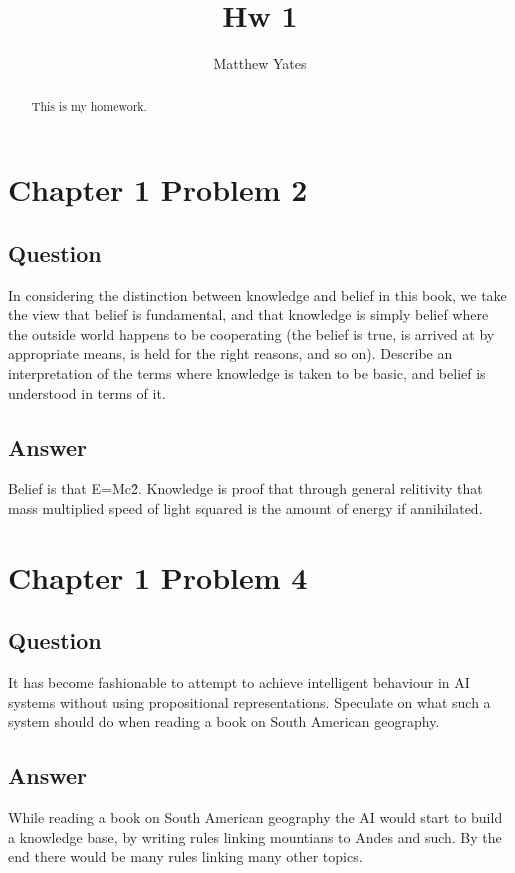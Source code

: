 \documentclass[10pt]{article}         %
\title{Hw 1}
\author{Matthew Yates}
\begin{document}
\maketitle

\begin{abstract}
This is my homework.
\end{abstract}

\section{Chapter 1 Problem 2}
\subsection{Question}
 In considering the distinction between knowledge and belief in this book,
 we take the view that belief is fundamental, and that knowledge is simply
 belief where the outside world happens to be cooperating (the belief is true,
 is arrived at by appropriate means, is held for the right reasons, and so on).
 Describe an interpretation of the terms where knowledge is taken to be basic,
 and belief is understood in terms of it.

\subsection{Answer}
Belief is that E=Mc\^2. Knowledge is proof that through general relitivity that
mass multiplied speed of light squared is the amount of energy if annihilated.

\section{Chapter 1 Problem 4}
\subsection{Question}
It has become fashionable to attempt to achieve intelligent behaviour in AI
systems without using propositional representations. Speculate on what such
a system should do when reading a book on South American geography.
\subsection{Answer}
While reading a book on South American geography the AI would start to build
a knowledge base, by writing rules linking mountians to Andes and such.
By the end there would be many rules linking many other topics.
\end{document}
